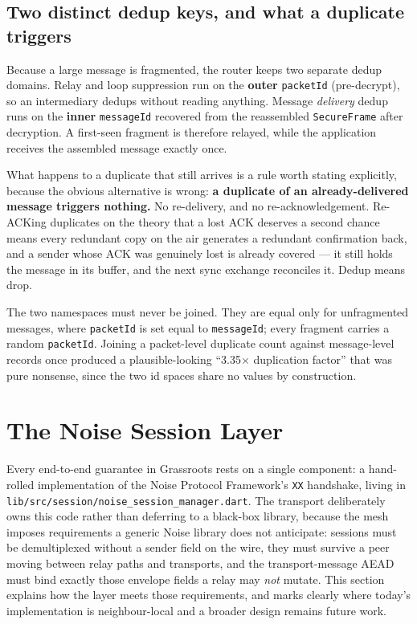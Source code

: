 \documentclass[11pt]{report}
\newcommand{\code}[1]{\texttt{\small #1}}
\begin{document}
\subsection*{Two distinct dedup keys, and what a duplicate triggers}

Because a large message is fragmented, the router keeps two separate dedup domains. Relay and loop suppression run on the \textbf{outer} \code{packetId} (pre-decrypt), so an intermediary dedups without reading anything. Message \emph{delivery} dedup runs on the \textbf{inner} \code{messageId} recovered from the reassembled \code{SecureFrame} after decryption. A first-seen fragment is therefore relayed, while the application receives the assembled message exactly once.

What happens to a duplicate that still arrives is a rule worth stating explicitly, because the obvious alternative is wrong: \textbf{a duplicate of an already-delivered message triggers nothing.} No re-delivery, and no re-acknowledgement. Re-ACKing duplicates on the theory that a lost ACK deserves a second chance means every redundant copy on the air generates a redundant confirmation back, and a sender whose ACK was genuinely lost is already covered --- it still holds the message in its buffer, and the next sync exchange reconciles it. Dedup means drop.

The two namespaces must never be joined. They are equal only for unfragmented messages, where \code{packetId} is set equal to \code{messageId}; every fragment carries a random \code{packetId}. Joining a packet-level duplicate count against message-level records once produced a plausible-looking ``3.35$\times$ duplication factor'' that was pure nonsense, since the two id spaces share no values by construction.

\section{The Noise Session Layer}

Every end-to-end guarantee in Grassroots rests on a single component: a hand-rolled implementation of the Noise Protocol Framework's \code{XX} handshake, living in \code{lib/src/session/noise\_session\_manager.dart}. The transport deliberately owns this code rather than deferring to a black-box library, because the mesh imposes requirements a generic Noise library does not anticipate: sessions must be demultiplexed without a sender field on the wire, they must survive a peer moving between relay paths and transports, and the transport-message AEAD must bind exactly those envelope fields a relay may \emph{not} mutate. This section explains how the layer meets those requirements, and marks clearly where today's implementation is neighbour-local and a broader design remains future work.
\end{document}
